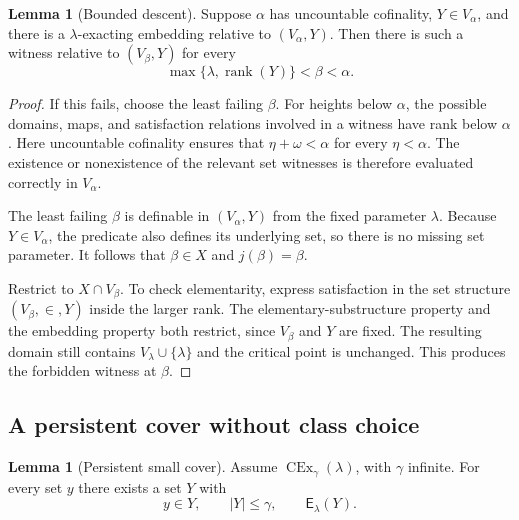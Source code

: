 \documentclass[11pt,letterpaper]{article}
\theoremstyle{definition}
\newtheorem{lemma}[definition]{Lemma}
\newcommand{\CEx}{\operatorname{CEx}}
\newcommand{\rank}{\operatorname{rank}}
\newcommand{\Erel}{\mathsf{E}}
\begin{document}
\begin{lemma}[Bounded descent]\label{lem:descent}
Suppose $\alpha$ has uncountable cofinality, $Y\in V_\alpha$, and there is a $\lambda$-exacting embedding relative to $(V_\alpha,Y)$. Then there is such a witness relative to $(V_\beta,Y)$ for every
\[
 \max\{\lambda,\rank(Y)\}<\beta<\alpha.
\]
\end{lemma}

\begin{proof}
If this fails, choose the least failing $\beta$. For heights below $\alpha$, the possible domains, maps, and satisfaction relations involved in a witness have rank below $\alpha$. Here uncountable cofinality ensures that $\eta+\omega<\alpha$ for every $\eta<\alpha$. The existence or nonexistence of the relevant set witnesses is therefore evaluated correctly in $V_\alpha$.

The least failing $\beta$ is definable in $(V_\alpha,Y)$ from the fixed parameter $\lambda$. Because $Y\in V_\alpha$, the predicate also defines its underlying set, so there is no missing set parameter. It follows that $\beta\in X$ and $j(\beta)=\beta$.

Restrict to $X\cap V_\beta$. To check elementarity, express satisfaction in the set structure $(V_\beta,\in,Y)$ inside the larger rank. The elementary-substructure property and the embedding property both restrict, since $V_\beta$ and $Y$ are fixed. The resulting domain still contains $V_\lambda\cup\{\lambda\}$ and the critical point is unchanged. This produces the forbidden witness at $\beta$.
\end{proof}

\subsection{A persistent cover without class choice}

\begin{lemma}[Persistent small cover]\label{lem:persistent}
Assume $\CEx_\gamma(\lambda)$, with $\gamma$ infinite. For every set $y$ there exists a set $Y$ with
\[
 y\in Y,\qquad |Y|\leq\gamma,\qquad \Erel_\lambda(Y).
\]
\end{lemma}
\end{document}
